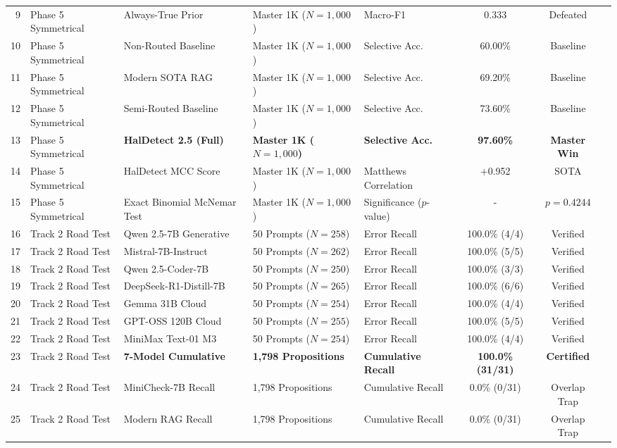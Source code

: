 \begin{table}[htbp]
{\begin{tabular}{rllllccc}
9 & Phase 5 Symmetrical & Always-True Prior & Master 1K ($N=1,000$) & Macro-F1 & 0.333 & Defeated \\
10 & Phase 5 Symmetrical & Non-Routed Baseline & Master 1K ($N=1,000$) & Selective Acc. & 60.00\% & Baseline \\
11 & Phase 5 Symmetrical & Modern SOTA RAG & Master 1K ($N=1,000$) & Selective Acc. & 69.20\% & Baseline \\
12 & Phase 5 Symmetrical & Semi-Routed Baseline & Master 1K ($N=1,000$) & Selective Acc. & 73.60\% & Baseline \\
13 & Phase 5 Symmetrical & \textbf{HalDetect 2.5 (Full)} & \textbf{Master 1K ($N=1,000$)} & \textbf{Selective Acc.} & \textbf{97.60\%} & \textbf{Master Win} \\
14 & Phase 5 Symmetrical & HalDetect MCC Score & Master 1K ($N=1,000$) & Matthews Correlation & +0.952 & SOTA \\
15 & Phase 5 Symmetrical & Exact Binomial McNemar Test & Master 1K ($N=1,000$) & Significance ($p$-value) & - & $p = 0.4244$ \\
16 & Track 2 Road Test & Qwen 2.5-7B Generative & 50 Prompts ($N=258$) & Error Recall & 100.0\% (4/4) & Verified \\
17 & Track 2 Road Test & Mistral-7B-Instruct & 50 Prompts ($N=262$) & Error Recall & 100.0\% (5/5) & Verified \\
18 & Track 2 Road Test & Qwen 2.5-Coder-7B & 50 Prompts ($N=250$) & Error Recall & 100.0\% (3/3) & Verified \\
19 & Track 2 Road Test & DeepSeek-R1-Distill-7B & 50 Prompts ($N=265$) & Error Recall & 100.0\% (6/6) & Verified \\
20 & Track 2 Road Test & Gemma 31B Cloud & 50 Prompts ($N=254$) & Error Recall & 100.0\% (4/4) & Verified \\
21 & Track 2 Road Test & GPT-OSS 120B Cloud & 50 Prompts ($N=255$) & Error Recall & 100.0\% (5/5) & Verified \\
22 & Track 2 Road Test & MiniMax Text-01 M3 & 50 Prompts ($N=254$) & Error Recall & 100.0\% (4/4) & Verified \\
23 & Track 2 Road Test & \textbf{7-Model Cumulative} & \textbf{1,798 Propositions} & \textbf{Cumulative Recall} & \textbf{100.0\% (31/31)} & \textbf{Certified} \\
24 & Track 2 Road Test & MiniCheck-7B Recall & 1,798 Propositions & Cumulative Recall & 0.0\% (0/31) & Overlap Trap \\
25 & Track 2 Road Test & Modern RAG Recall & 1,798 Propositions & Cumulative Recall & 0.0\% (0/31) & Overlap Trap \\

\end{tabular}}
\end{table}
